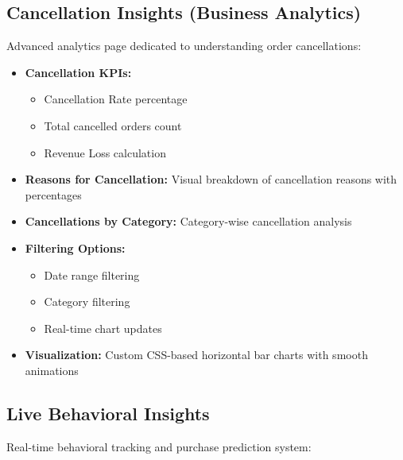 \documentclass[12pt,a4paper]{article}
\begin{document}
\subsection{Cancellation Insights (Business Analytics)}

Advanced analytics page dedicated to understanding order cancellations:

\begin{itemize}[leftmargin=*]
    \item \textbf{Cancellation KPIs:}
    \begin{itemize}
        \item Cancellation Rate percentage
        \item Total cancelled orders count
        \item Revenue Loss calculation
    \end{itemize}
    
    \item \textbf{Reasons for Cancellation:} Visual breakdown of cancellation reasons with percentages
    
    \item \textbf{Cancellations by Category:} Category-wise cancellation analysis

    
    \item \textbf{Filtering Options:}
    \begin{itemize}
        \item Date range filtering
        \item Category filtering
        \item Real-time chart updates
    \end{itemize}
    
    \item \textbf{Visualization:} Custom CSS-based horizontal bar charts with smooth animations
\end{itemize}

\subsection{Live Behavioral Insights}

Real-time behavioral tracking and purchase prediction system:
\end{document}

